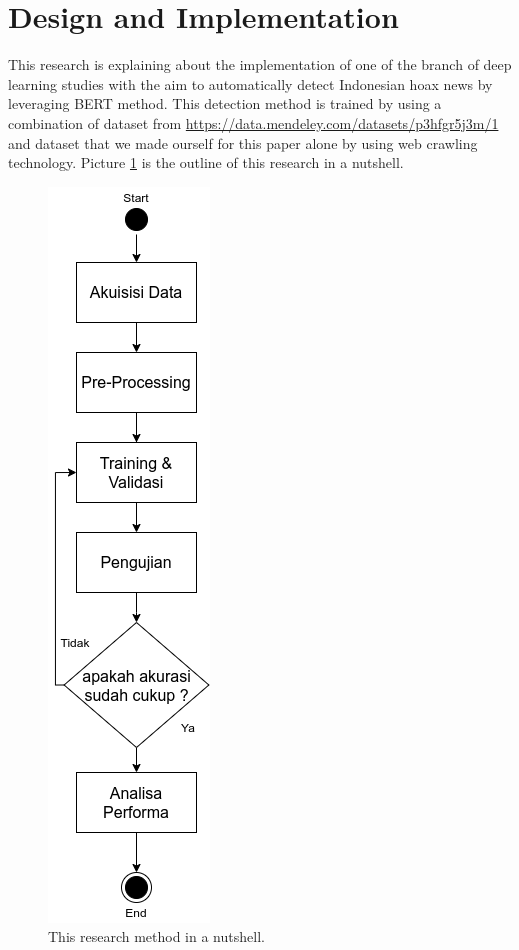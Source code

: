 \section{Design and Implementation}
\label{sec:designandimplementation}

This research is explaining about the implementation of one of the branch of deep learning studies with the aim to automatically detect Indonesian hoax news by leveraging BERT method. This detection method is trained by using a combination of dataset from \url{https://data.mendeley.com/datasets/p3hfgr5j3m/1} and dataset that we made ourself for this paper alone by using web crawling technology. Picture \ref{fig:metodologi} is the outline of this research in a nutshell.

\begin{figure} [h!]
    \centering
    \includegraphics[width=0.3\columnwidth]{gambar/metodologi_vertical.png}
    \caption{This research method in a nutshell.}
    \label{fig:metodologi}
\end{figure}

